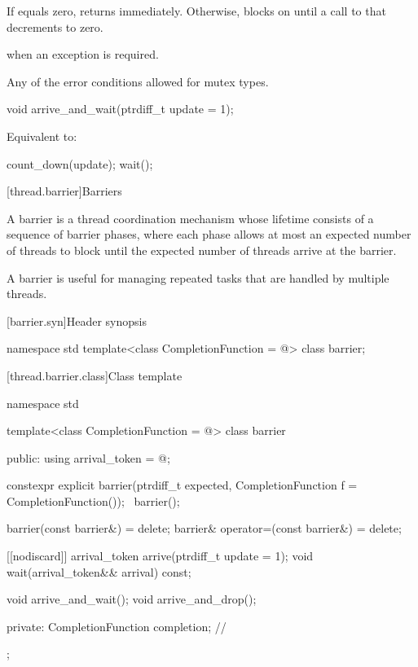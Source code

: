\begin{itemdescr}
\pnum
\effects
If  equals zero, returns immediately.
Otherwise, blocks on 
until a call to  that decrements  to zero.

\pnum
\throws
{} when an exception is required.

\pnum
\errors
Any of the error conditions
allowed for mutex types.
\end{itemdescr}

%
\begin{itemdecl}
void arrive_and_wait(ptrdiff_t update = 1);
\end{itemdecl}

\begin{itemdescr}
\pnum
\effects
Equivalent to:
\begin{codeblock}
count_down(update);
wait();
\end{codeblock}
\end{itemdescr}

[thread.barrier]{Barriers}

\pnum
A barrier is a thread coordination mechanism
whose lifetime consists of a sequence of barrier phases,
where each phase allows at most an expected number of threads to block
until the expected number of threads arrive at the barrier.
\begin{note}
A barrier is useful for managing repeated tasks
that are handled by multiple threads.
\end{note}

[barrier.syn]{Header  synopsis}
%

\begin{codeblock}
namespace std {
  template<class CompletionFunction = @\seebelow@>
    class barrier;
}
\end{codeblock}

[thread.barrier.class]{Class template }

\begin{codeblock}
namespace std {
  template<class CompletionFunction = @\seebelow@>
  class barrier {
  public:
    using arrival_token = @\seebelow@;

    constexpr explicit barrier(ptrdiff_t expected,
                               CompletionFunction f = CompletionFunction());
    ~barrier();

    barrier(const barrier&) = delete;
    barrier& operator=(const barrier&) = delete;

    [[nodiscard]] arrival_token arrive(ptrdiff_t update = 1);
    void wait(arrival_token&& arrival) const;

    void arrive_and_wait();
    void arrive_and_drop();

  private:
    CompletionFunction completion;      // \expos
  };
}
\end{codeblock}

